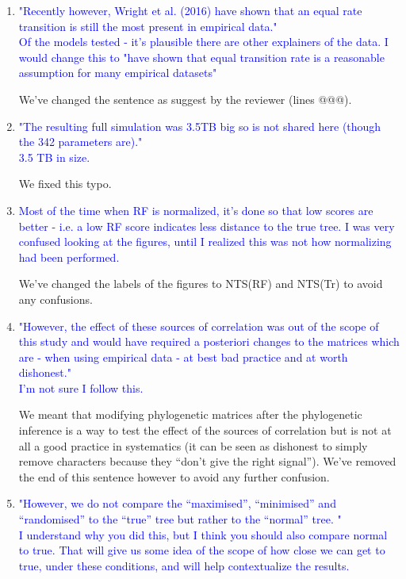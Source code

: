 \documentclass[12pt,letterpaper]{article}
\begin{document}
\begin{enumerate}

\item{\textcolor{blue}{"Recently however, Wright et al. (2016) have shown that an equal rate transition is still the most present in empirical data."\\
Of the models tested - it's plausible there are other explainers of the data. I would change this to "have shown that equal transition rate is a reasonable assumption for many empirical datasets"}}

We've changed the sentence as suggest by the reviewer (lines @@@).

\item{\textcolor{blue}{"The resulting full simulation was 3.5TB big so is not shared here (though the 342 parameters are)."\\
3.5 TB in size.}}

We fixed this typo.

\item{\textcolor{blue}{Most of the time when RF is normalized, it's done so that low scores are better - i.e. a low RF score indicates less distance to the true tree. I was very confused looking at the figures, until I realized this was not how normalizing had been performed. }}

We've changed the labels of the figures to NTS(RF) and NTS(Tr) to avoid any confusions.

\item{\textcolor{blue}{"However, the effect of these sources of correlation was out of the scope of this study and would have required a posteriori changes to the matrices which are - when using empirical data - at best bad practice and at worth dishonest."\\
I'm not sure I follow this.}}
\label{dishonest}

We meant that modifying phylogenetic matrices after the phylogenetic inference is a way to test the effect of the sources of correlation but is not at all a good practice in systematics (it can be seen as dishonest to simply remove characters because they ``don't give the right signal''). We've removed the end of this sentence however to avoid any further confusion.

\item{\textcolor{blue}{"However, we do not compare the ``maximised'', ``minimised'' and ``randomised'' to the ``true'' tree but rather to the ``normal'' tree. "\\
I understand why you did this, but I think you should also compare normal to true. That will give us some idea of the scope of how close we can get to true, under these conditions, and will help contextualize the results.}}


\end{enumerate}
\end{document}
